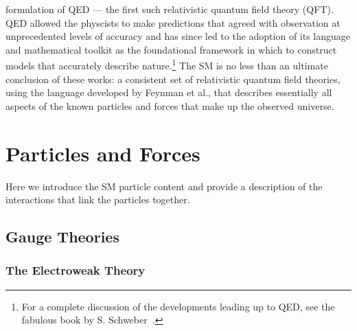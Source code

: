formulation of QED --- the first such relativistic quantum field theory (QFT).
QED allowed the physcists to make predictions that agreed with observation at unprecedented levels
of accuracy and has since led to the adoption of its language and mathematical toolkit as the
foundational framework in which to construct models that accurately describe nature.\footnote{
	For a complete discussion of the developments leading up to QED, see the fabulous
	book by S. Schweber~\cite{Schweber:1994qa}.	
}
The SM is no less than an ultimate conclusion of these works: a consistent set of relativistic
quantum field theories, using the language developed by Feynman et al.,
that describes essentially all aspects of the known particles and forces that make up the 
observed universe.


\section{Particles and Forces}

Here we introduce the SM particle content and provide a description of the interactions that
link the particles together.





\subsection{Gauge Theories}

\subsubsection{The Electroweak Theory}


